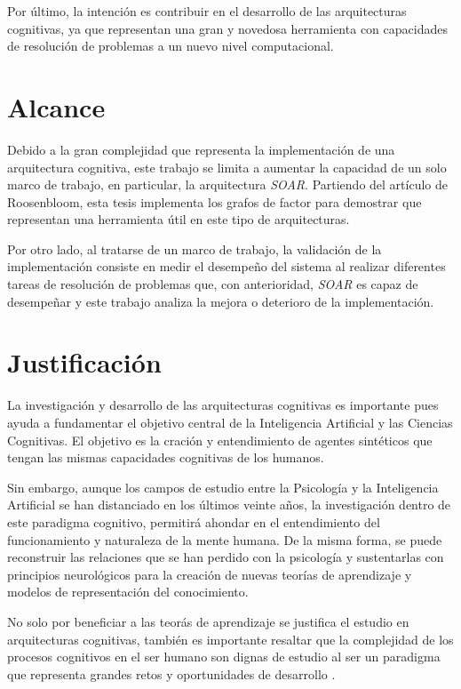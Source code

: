 Por \'{u}ltimo, la intenci\'{o}n es contribuir en el desarrollo de las arquitecturas cognitivas, ya que representan una gran y novedosa herramienta \cite{langley1991design} con capacidades de resoluci\'{o}n de problemas a un nuevo nivel computacional. 

\section{Alcance}

Debido a la gran complejidad que representa la implementaci\'{o}n de una arquitectura cognitiva, este trabajo se limita a aumentar la capacidad de un solo marco de trabajo, en particular, la arquitectura \emph{SOAR}. Partiendo del art\'{i}culo de Roosenbloom, esta tesis implementa los grafos de factor para demostrar que representan una herramienta \'{u}til en este tipo de arquitecturas. 

Por otro lado, al tratarse de un marco de trabajo, la validaci\'{o}n de la implementaci\'{o}n consiste en medir el desempe\~no del sistema al realizar diferentes tareas de resoluci\'{o}n de problemas que, con anterioridad, \emph{SOAR} es capaz de desempe\~nar y este trabajo analiza la mejora o deterioro de la implementaci\'{o}n. 

\section{Justificaci\'{o}n}

La investigaci\'{o}n y desarrollo de las arquitecturas cognitivas es importante pues ayuda a fundamentar el objetivo central de la Inteligencia Artificial y las Ciencias Cognitivas. El objetivo es la craci\'{o}n y entendimiento de agentes sint\'{e}ticos que tengan las mismas capacidades cognitivas de los humanos. 

Sin embargo, aunque los campos de estudio entre la Psicolog\'{i}a y la Inteligencia Artificial se han distanciado en los \'{u}ltimos veinte a\~nos, la investigaci\'{o}n dentro de este paradigma cognitivo, permitir\'{a} ahondar en el entendimiento del funcionamiento y naturaleza de la mente humana. De la misma forma, se puede reconstruir las relaciones que se han perdido con la psicolog\'{i}a y sustentarlas con principios neurol\'{o}gicos para la creaci\'{o}n de nuevas teor\'{i}as de aprendizaje y modelos de representaci\'{o}n del conocimiento.

 No solo por beneficiar a las teor\'{a}s de aprendizaje se justifica el estudio en arquitecturas cognitivas, tambi\'{e}n es importante resaltar que la complejidad de los procesos cognitivos en el ser humano son dignas de estudio al ser un paradigma que representa grandes retos y oportunidades de desarrollo \cite{langley2006intelligent} .
 
